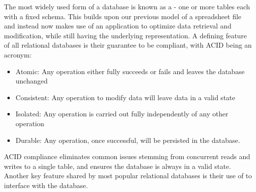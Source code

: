 The most widely used form of a database is known as a  - one or more tables each with a fixed schema. This builds upon our previous model of a spreadsheet file and instead now makes use of an application to optimize data retrieval and modification, while still having the underlying representation. A defining feature of all relational databases is their guarantee to be  compliant, with ACID being an acronym:

\begin{itemize}
    \item Atomic: Any operation either fully succeeds or fails and leaves the database unchanged
    \item Consistent: Any operation to modify data will leave data in a valid state
    \item Isolated: Any operation is carried out fully independently of any other operation
    \item Durable: Any operation, once successful, will be persisted in the database.
\end{itemize}

ACID compliance eliminates common issues stemming from concurrent reads and writes to a single table, and ensures the database is always in a valid state. Another key feature shared by most popular relational databases is their use of  to interface with the database.

